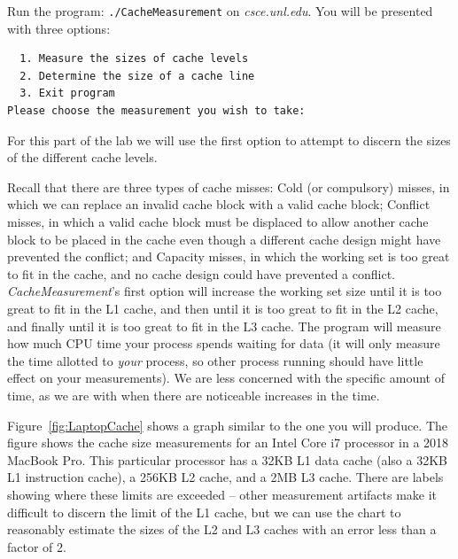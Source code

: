 Run the program: \texttt{./CacheMeasurement} on \textit{csce.unl.edu}. You will
be presented with three options:

\begin{verbatim}
  1. Measure the sizes of cache levels
  2. Determine the size of a cache line
  3. Exit program
Please choose the measurement you wish to take:
\end{verbatim}

For this part of the lab we will use the first option to attempt to discern the
sizes of the different cache levels.

Recall that there are three types of cache misses: Cold (or compulsory) misses,
in which we can replace an invalid cache block with a valid cache block;
Conflict misses, in which a valid cache block must be displaced to allow
another cache block to be placed in the cache even though a different cache
design might have prevented the conflict; and Capacity misses, in which the
working set is too great to fit in the cache, and no cache design could have
prevented a conflict. \textit{CacheMeasurement}'s first option will increase the
working set size until it is too great to fit in the L1 cache, and then until it
is too great to fit in the L2 cache, and finally until it is too great to fit in
the L3 cache. The program will measure how much CPU time your process spends
waiting for data (it will only measure the time allotted to \textit{your}
process, so other process running should have little effect on your
measurements). We are less concerned with the specific amount of time, as we are
with when there are noticeable increases in the time.

Figure~\ref{fig:LaptopCache} shows a graph similar to the one you will
produce. The figure shows the cache size measurements for an Intel Core i7
processor in a 2018 MacBook Pro. This particular processor has a 32KB L1 data
cache (also a 32KB L1 instruction cache), a 256KB L2 cache, and a 2MB L3 cache.
There are labels showing where these limits are exceeded -- other measurement
artifacts make it difficult to discern the limit of the L1 cache, but we can use
the chart to reasonably estimate the sizes of the L2 and L3 caches with an error
less than a factor of 2.

